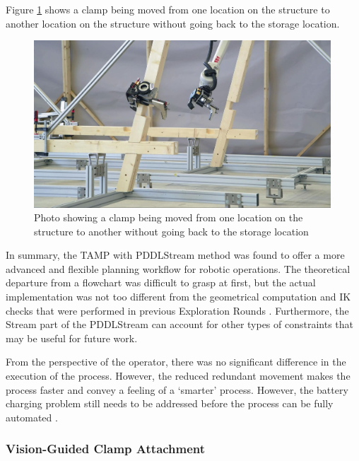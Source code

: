 Figure \ref{fig:photo-clamp-transfer-without-storage} shows a clamp being moved from one location on the structure to another location on the structure without going back to the storage location.

\begin{figure}[!h]
    \centering
    \includegraphics[width=0.99\textwidth]{images/08/img35.jpg}
    \caption{Photo showing a clamp being moved from one location on the structure to another without going back to the storage location}
    \label{fig:photo-clamp-transfer-without-storage}
\end{figure}

In summary, the TAMP with PDDLStream method was found to offer a more advanced and flexible planning workflow for robotic operations. The theoretical departure from a flowchart was difficult to grasp at first, but the actual implementation was not too different from the geometrical computation and IK checks that were performed in previous Exploration Rounds . Furthermore, the Stream part of the PDDLStream can account for other types of constraints that may be useful for future work. 

From the perspective of the operator, there was no significant difference in the execution of the process.
However, the reduced redundant movement makes the process faster and convey a feeling of a `smarter' process. However, the battery charging problem still needs to be addressed before the process can be fully automated .

\subsubsection{Vision-Guided Clamp Attachment}
\label{subsubsection:exploration-5-vision-guided-clamp-attachment}

